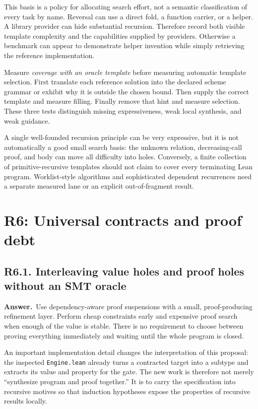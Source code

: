 \documentclass[11pt,a4paper]{article}
\newcommand{\code}[1]{\nolinkurl{#1}}
\newcommand{\qid}[3]{\subsection{#2. #3}\label{#1}}
\newcommand{\answer}{\noindent\textbf{Answer.}\ }
\theoremstyle{remark}
\begin{document}
This basis is a policy for allocating search effort, not a semantic classification of every task by name. Reversal can use a direct fold, a function carrier, or a helper. A library provider can hide substantial recursion. Therefore record both visible template complexity and the capabilities supplied by providers. Otherwise a benchmark can appear to demonstrate helper invention while simply retrieving the reference implementation.

Measure \emph{coverage with an oracle template} before measuring automatic template selection. First translate each reference solution into the declared scheme grammar or exhibit why it is outside the chosen bound. Then supply the correct template and measure filling. Finally remove that hint and measure selection. These three tests distinguish missing expressiveness, weak local synthesis, and weak guidance.

A single well-founded recursion principle can be very expressive, but it is not automatically a good small search basis: the unknown relation, decreasing-call proof, and body can move all difficulty into holes. Conversely, a finite collection of primitive-recursive templates should not claim to cover every terminating Lean program. Worklist-style algorithms and sophisticated dependent recurrences need a separate measured lane or an explicit out-of-fragment result.

\section{R6: Universal contracts and proof debt}\label{sec:r6}

\qid{q61}{R6.1}{Interleaving value holes and proof holes without an SMT oracle}
\answer Use dependency-aware proof suspensions with a small, proof-producing refinement layer. Perform cheap constraints early and expensive proof search when enough of the value is stable. There is no requirement to choose between proving everything immediately and waiting until the whole program is closed.

An important implementation detail changes the interpretation of this proposal: the inspected \code{Engine.lean} already turns a contracted target into a subtype and extracts its value and property for the gate. The new work is therefore not merely ``synthesize program and proof together.'' It is to carry the specification into recursive motives so that induction hypotheses expose the properties of recursive results locally.~\cite{engine}
\end{document}
